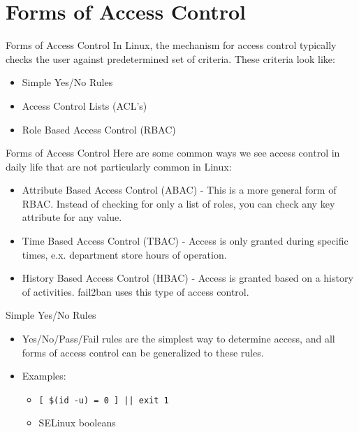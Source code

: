 \documentclass{beamer}
\begin{document}
\section{Forms of Access Control}

\begin{frame}{Forms of Access Control}
In Linux, the mechanism for access control typically checks the user against predetermined set of criteria.
\break \break
These criteria look like:
\begin {itemize}
\item Simple Yes/No Rules
\item Access Control Lists (ACL's)
\item Role Based Access Control (RBAC)
\end{itemize}
\end{frame}

\begin{frame}{Forms of Access Control}
Here are some common ways we see access control in daily life that are not particularly common in Linux:
\begin{itemize}
\item Attribute Based Access Control (ABAC) - This is a more general form of RBAC. Instead of checking for only a list of roles, you can check any key attribute for any value.
\item Time Based Access Control (TBAC) - Access is only granted during specific times, e.x. department store hours of operation.
\item History Based Access Control (HBAC) - Access is granted based on a history of activities. fail2ban uses this type of access control.
\end{itemize}
\end{frame}

\begin{frame}{Simple Yes/No Rules}
\begin{itemize}
\item Yes/No/Pass/Fail rules are the simplest way to determine access, and all forms of access control can be generalized to these rules.
\item Examples:
\begin{itemize}
\item \texttt{[ \$(id -u) = 0 ] || exit 1}
\item SELinux booleans
\end{itemize}
\end{itemize}
\end{frame}
\end{document}
